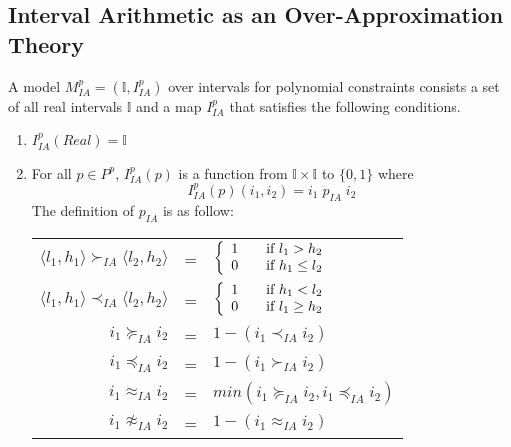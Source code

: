 \subsection{Interval Arithmetic as an Over-Approximation Theory} \label{sec:Gen-IA}
\sloppy
A model $M^p_{IA} = (\mathbb{I}, I^p_{IA})$ over intervals for polynomial constraints consists a set of all real intervals $\mathbb{I}$ and a map $I^p_{IA}$ that satisfies the following conditions.
\begin{enumerate}
\item $I^p_{IA}(Real) = \mathbb{I}$
\item For all $p \in P^p$, $I^p_{IA}(p)$ is a function from $\mathbb{I}\times \mathbb{I}$ to $\{0, 1\}$ where \[I^p_{IA}(p)(i_1, i_2) = i_1 \; p_{IA} \; i_2\] The definition of $ p_{IA}$ is as follow:
\begin{center}
\begin{tabular} {r c l}
$\langle l_1, h_1\rangle  \succ_{IA} \langle l_2,  h_2\rangle$  &=& $\left\{ 
  \begin{array}{c l}
    1 & \quad \text{if } l_1 > h_2\\
    0 & \quad \text{if } h_1 \le l_2 \\
  \end{array} \right.$ \\
  
$\langle l_1, h_1\rangle  \prec_{IA} \langle l_2,  h_2\rangle$ & = & $\left\{ 
  \begin{array}{c l}
    1 & \quad \text{if } h_1 < l_2\\
    0 & \quad \text{if } l_1 \ge h_2 \\
  \end{array} \right.$\\
  
$i_1 \succeq_{IA} i_2$ &=& $1 - (i_1 \prec_{IA} i_2)$\\

$i_1 \preceq_{IA} i_2$ &=& $1 - (i_1 \succ_{IA} i_2)$ \\
$i_1 \approx_{IA} i_2 $ &=& $ min (i_1 \succeq_{IA} i_2, i_1 \preceq_{IA} i_2)$\\
$i_1 \not\approx_{IA} i_2 $ &=& $ 1 - (i_1 \approx_{IA} i_2)$
\end{tabular}
\end{center}


\end{enumerate}
